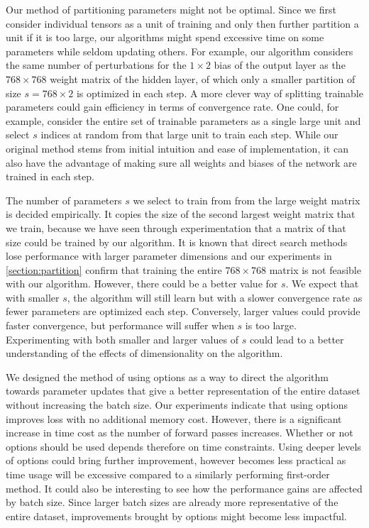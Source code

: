 
Our method of partitioning parameters might not be
optimal. Since we first consider individual tensors
as a unit of training and only then 
further partition a unit if it is too large, 
our algorithms might spend excessive time 
on some parameters while seldom updating others.
For example, our algorithm considers the same number of 
perturbations for the $1\times2$ 
bias of the output layer
as the $768\times768$ weight matrix of the hidden layer,
of which only a smaller partition of size $s=768\times2$ 
is optimized in each step. 
A more clever way of splitting trainable parameters 
could gain efficiency in terms of convergence rate.
One could, for example, consider the entire set of 
trainable parameters as a single large unit and 
select $s$ indices at random from that large unit 
to train each step. 
While our original method stems from initial intuition 
and ease of implementation, it can also have the 
advantage of making sure all weights and biases of 
the network are trained in each step. 

The number of parameters $s$ we select to train from 
from the large weight matrix is decided empirically. 
It copies the size of the second largest weight matrix 
that we train, because we have seen through 
experimentation that a matrix of that size could be trained 
by our algorithm. 
It is known that direct search methods lose 
performance with larger parameter dimensions and our 
experiments in \autoref{section:partition} confirm 
that training the entire $768\times768$ matrix 
is not feasible with our algorithm. However,
there could be a better value 
for $s$. We expect that with smaller $s$, the algorithm
will still learn but with a slower convergence rate 
as fewer parameters are optimized each step. 
Conversely, larger values could provide faster 
convergence, but performance will suffer when $s$ is 
too large. Experimenting with both smaller and 
larger values of $s$ could lead to a better understanding
of the effects of dimensionality on the algorithm.

We designed the method of using options as a way to 
direct the algorithm towards parameter updates that 
give a better representation of the entire dataset
without increasing the batch size. Our experiments
indicate that using options improves loss with no
additional memory cost. However, there is a 
significant increase in time cost as the number
of forward passes increases. Whether or not options 
should be used depends therefore on time 
constraints. Using deeper levels of options 
could bring further improvement, however becomes 
less practical as time usage will be excessive 
compared to a similarly performing first-order method.
It could also be interesting to 
see how the performance gains are affected by batch size.
Since larger batch sizes are already more representative 
of the entire dataset, improvements brought 
by options might become less impactful.

